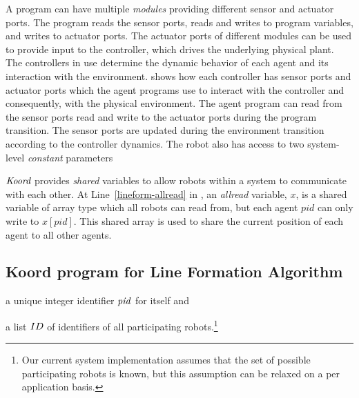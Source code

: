 A \lgname program can have multiple \emph{modules} providing different sensor and actuator ports.
The program reads the sensor ports, reads and writes to program variables, and writes to actuator ports.
The actuator ports of different modules can be used to provide input to the controller, which drives the underlying physical plant.
The controllers in use determine the dynamic behavior of each agent and its interaction with the environment.
 shows how each controller has sensor ports and actuator ports which the agent programs use to interact with the controller and consequently, with the physical environment.
The agent program can read from the sensor ports read and write to the actuator ports during the program transition.
The sensor ports are updated during the environment transition according to the controller dynamics.
%
The robot also has access to two system-level \emph{constant} parameters




$\emph{Koord}$ provides \emph{shared} variables to allow robots within a system to communicate with each other.
At Line~\ref{lineform-allread} in , an \emph{allread} variable, $x$, is a shared variable of array type which all robots can read from,
but each agent $pid$ can only write to $x[pid]$.
This shared array is used to share the current position of each agent to all other agents.


\subsection{Koord program for Line Formation Algorithm}



\begin{inparaenum}[(a)]
\item a unique integer identifier $\mathit{pid}$ for itself and
\item a list $ID$ of identifiers of all participating robots.\footnote{Our current system implementation assumes that the set of possible participating robots is known, but this assumption can be relaxed on a per application basis.}
\end{inparaenum}


